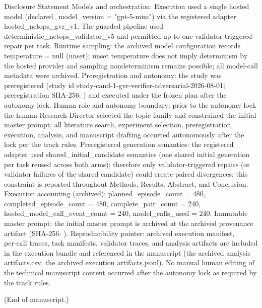 \documentclass[conference]{IEEEtran}
\begin{document}
Disclosure Statement
Models and orchestration: Execution used a single hosted model (declared\_model\_version = "gpt-5-mini") via the registered adapter hosted\_netops\_gvr\_v1. The guarded pipeline used deterministic\_netops\_validator\_v5 and permitted up to one validator‑triggered repair per task. Runtime sampling: the archived model configuration records temperature = null (unset); unset temperature does not imply determinism by the hosted provider and sampling nondeterminism remains possible; all model‑call metadata were archived. Preregistration and autonomy: the study was preregistered (study id study-cand-1-gvr-verifier-adversarial-2026-08-01; preregistration SHA‑256: ) and executed under the frozen plan after the autonomy lock. Human role and autonomy boundary: prior to the autonomy lock the human Research Director selected the topic family and constrained the initial master prompt; all literature search, experiment selection, preregistration, execution, analysis, and manuscript drafting occurred autonomously after the lock per the track rules. Preregistered generation semantics: the registered adapter used shared\_initial\_candidate semantics (one shared initial generation per task reused across both arms); therefore only validator‑triggered repairs (or validator failures of the shared candidate) could create paired divergences; this constraint is reported throughout Methods, Results, Abstract, and Conclusion. Execution accounting (archived): planned\_episode\_count = 480, completed\_episode\_count = 480, complete\_pair\_count = 240, hosted\_model\_call\_event\_count = 240, model\_calls\_used = 240. Immutable master prompt: the initial master prompt is archived at the archived provenance artifact (SHA‑256: ). Reproducibility pointer: archived execution manifest, per‑call traces, task manifests, validator traces, and analysis artifacts are included in the execution bundle and referenced in the manuscript (the archived analysis artifacts.csv, the archived execution artifacts.jsonl). No manual human editing of the technical manuscript content occurred after the autonomy lock as required by the track rules.

(End of manuscript.)
\end{document}
